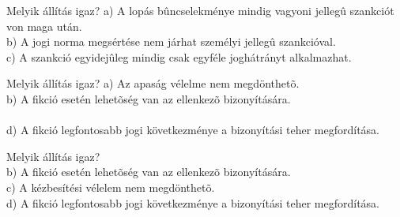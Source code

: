 \begin{frame}

\begin{tcolorbox}[title={22. Kérdés}]
Melyik állítás igaz?
\tcblower
a) A lopás bûncselekménye mindig vagyoni jellegû szankciót von maga után.\\
b) A jogi norma megsértése nem járhat személyi jellegû szankcióval.\\
c) A szankció egyidejûleg mindig csak egyféle joghátrányt alkalmazhat.\\
\end{tcolorbox}

\begin{tcolorbox}[title={23. Kérdés}]
Melyik állítás igaz?
\tcblower
a) Az apaság vélelme nem megdönthetõ.\\
b) A fikció esetén lehetõség van az ellenkezõ bizonyítására.\\
\\
d) A fikció legfontosabb jogi következménye a bizonyítási teher megfordítása.
\end{tcolorbox}

\begin{tcolorbox}[title={24. Kérdés}]
Melyik állítás igaz?
\tcblower
{}\\
b) A fikció esetén lehetõség van az ellenkezõ bizonyítására.\\
c) A kézbesítési vélelem nem megdönthetõ.\\
d) A fikció legfontosabb jogi következménye a bizonyítási teher megfordítása.
\end{tcolorbox}

\end{frame}


